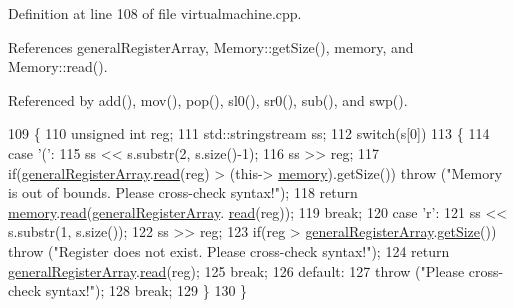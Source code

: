 Definition at line 108 of file virtualmachine.\+cpp.



References general\+Register\+Array, Memory\+::get\+Size(), memory, and Memory\+::read().



Referenced by add(), mov(), pop(), sl0(), sr0(), sub(), and swp().


\begin{DoxyCode}
109 \{
110     \textcolor{keywordtype}{unsigned} \textcolor{keywordtype}{int} reg;
111     std::stringstream ss;
112     \textcolor{keywordflow}{switch}(s[0])
113     \{
114         \textcolor{keywordflow}{case} \textcolor{charliteral}{'('}:
115             ss << s.substr(2, s.size()-1);
116             ss >> reg;
117             \textcolor{keywordflow}{if}(\mbox{\hyperlink{class_virtual_machine_aae855da52e8f3b0a167b8fec497d44d9}{generalRegisterArray}}.\mbox{\hyperlink{class_memory_ab669beeca09308c880af9b13cde7f655}{read}}(reg) > (this->
      \mbox{\hyperlink{class_virtual_machine_a54136a9c003e36e77c28f31c7bef2dc2}{memory}}).getSize()) \textcolor{keywordflow}{throw} (\textcolor{stringliteral}{"Memory is out of bounds. Please cross-check syntax!"});
118             \textcolor{keywordflow}{return} \mbox{\hyperlink{class_virtual_machine_a54136a9c003e36e77c28f31c7bef2dc2}{memory}}.\mbox{\hyperlink{class_memory_ab669beeca09308c880af9b13cde7f655}{read}}(\mbox{\hyperlink{class_virtual_machine_aae855da52e8f3b0a167b8fec497d44d9}{generalRegisterArray}}.
      \mbox{\hyperlink{class_memory_ab669beeca09308c880af9b13cde7f655}{read}}(reg));
119             \textcolor{keywordflow}{break};
120         \textcolor{keywordflow}{case} \textcolor{charliteral}{'r'}:
121             ss << s.substr(1, s.size());
122             ss >> reg;
123             \textcolor{keywordflow}{if}(reg > \mbox{\hyperlink{class_virtual_machine_aae855da52e8f3b0a167b8fec497d44d9}{generalRegisterArray}}.\mbox{\hyperlink{class_memory_a9687fde54e7c10c54060117045060613}{getSize}}()) \textcolor{keywordflow}{throw} (\textcolor{stringliteral}{"Register does not
       exist. Please cross-check syntax!"});
124             \textcolor{keywordflow}{return} \mbox{\hyperlink{class_virtual_machine_aae855da52e8f3b0a167b8fec497d44d9}{generalRegisterArray}}.\mbox{\hyperlink{class_memory_ab669beeca09308c880af9b13cde7f655}{read}}(reg);
125             \textcolor{keywordflow}{break};
126         \textcolor{keywordflow}{default}:
127             \textcolor{keywordflow}{throw} (\textcolor{stringliteral}{"Please cross-check syntax!"});
128             \textcolor{keywordflow}{break};
129     \}
130 \}
\end{DoxyCode}
